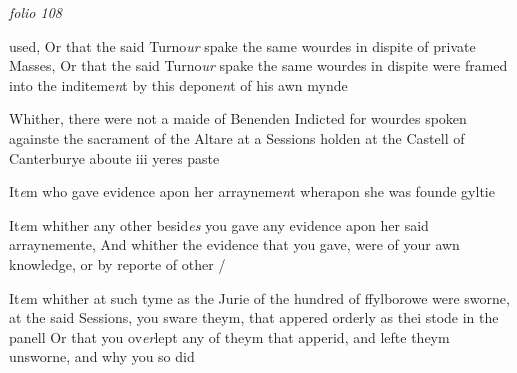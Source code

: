\documentclass[12pt, a4paper]{book}
\begin{document}
\dotfill
						\newpage
{}

\textit{folio 108}


 	
 		
		\ifthenelse{\isodd{\thepage}}
		{\reversemarginpar}
		{\normalmarginpar}
		
 			used, Or that the said Turno\textit{ur} spake the same wourdes
 			in dispite of private Masses, Or that the said Turno\textit{ur}
 spake the same wourdes in dispite were framed into the
 inditeme\textit{n}t by this depone\textit{n}t of his awn mynde
 




				\marginpar[\vspace{0.5cm}{\textcolor{Gray}{9}}]{}
			
		\ifthenelse{\isodd{\thepage}}
		{\reversemarginpar}
		{\normalmarginpar}
		 Whither, there were not a maide of Benenden Indicted
 for wourdes spoken againste the sacrament of the Altare
 at a Sessions holden at the Castell of Canterburye
 aboute iii yeres paste
 




				\marginpar[\vspace{0.5cm}{\textcolor{Gray}{10}}]{}
			
		\ifthenelse{\isodd{\thepage}}
		{\reversemarginpar}
		{\normalmarginpar}
		 It\textit{e}m who gave evidence apon her arrayneme\textit{n}t wherapon
 she was founde gyltie
 




				\marginpar[\vspace{0.5cm}{\textcolor{Gray}{11}}]{}
			
		\ifthenelse{\isodd{\thepage}}
		{\reversemarginpar}
		{\normalmarginpar}
		 It\textit{e}m whither any other besid\textit{es} you gave any evidence apon
 her said arraynemente, And whither the evidence that
 you gave, were of your awn knowledge, or by reporte
 of other /
 




				\marginpar[\vspace{0.5cm}{\textcolor{Gray}{12}}]{}
			
		\ifthenelse{\isodd{\thepage}}
		{\reversemarginpar}
		{\normalmarginpar}
		 It\textit{e}m whither at such tyme as the Jurie of the hundred of
 ffylborowe were sworne, at the said Sessions, you sware
 theym, that appered orderly as thei stode in the panell
 Or that you ov\textit{er}lept any of theym that apperid, and lefte
 theym unsworne, and why you so did
 
\end{document}
